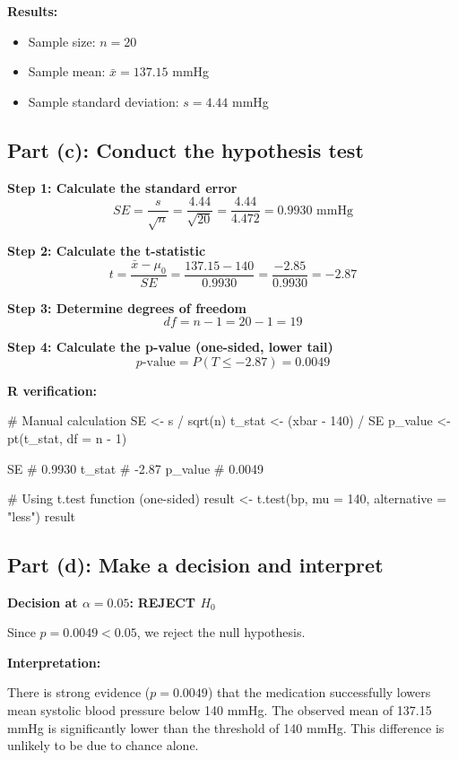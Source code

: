 \documentclass[11pt]{article}
\begin{document}
\textbf{Results:}
\begin{itemize}
\item Sample size: $n = 20$
\item Sample mean: $\bar{x} = 137.15$ mmHg
\item Sample standard deviation: $s = 4.44$ mmHg
\end{itemize}

\subsection*{Part (c): Conduct the hypothesis test}

\textbf{Step 1: Calculate the standard error}
$$SE = \frac{s}{\sqrt{n}} = \frac{4.44}{\sqrt{20}} = \frac{4.44}{4.472} = 0.9930 \text{ mmHg}$$

\textbf{Step 2: Calculate the t-statistic}
$$t = \frac{\bar{x} - \mu_0}{SE} = \frac{137.15 - 140}{0.9930} = \frac{-2.85}{0.9930} = -2.87$$

\textbf{Step 3: Determine degrees of freedom}
$$df = n - 1 = 20 - 1 = 19$$

\textbf{Step 4: Calculate the p-value (one-sided, lower tail)}
$$p\text{-value} = P(T \leq -2.87) = 0.0049$$

\textbf{R verification:}
\begin{rcode}
# Manual calculation
SE <- s / sqrt(n)
t_stat <- (xbar - 140) / SE
p_value <- pt(t_stat, df = n - 1)

SE        # 0.9930
t_stat    # -2.87
p_value   # 0.0049

# Using t.test function (one-sided)
result <- t.test(bp, mu = 140, alternative = "less")
result
\end{rcode}

\subsection*{Part (d): Make a decision and interpret}

\textbf{Decision at $\alpha = 0.05$:} \textbf{REJECT $H_0$}

Since $p = 0.0049 < 0.05$, we reject the null hypothesis.

\textbf{Interpretation:}

There is strong evidence ($p = 0.0049$) that the medication successfully lowers mean systolic blood pressure below 140 mmHg. The observed mean of 137.15 mmHg is significantly lower than the threshold of 140 mmHg. This difference is unlikely to be due to chance alone.
\end{document}
